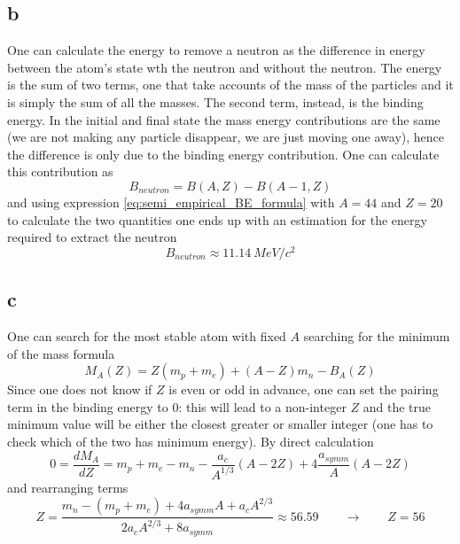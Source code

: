 \subsection*{b}
One can calculate the energy to remove a neutron as the difference in energy between the atom's state wth the neutron and without the neutron. The energy is the sum of
two terms, one that take accounts of the mass of the particles and it is simply the sum of all the masses. The second term, instead, is the binding energy. In the initial and final
state the mass energy contributions are the same (we are not making any particle disappear, we are just moving one away), hence the difference is only due to the binding energy contribution. One can
calculate this contribution as
\begin{equation*}
    B_{neutron} = B(A, Z) - B(A-1, Z)
\end{equation*}
and using expression \ref{eq:semi_empirical_BE_formula} with $A=44$ and $Z=20$ to calculate the two quantities one ends up with an estimation for the energy required to extract the neutron
\begin{equation*}
    B_{neutron} \approx 11.14~MeV/c^2
\end{equation*}

\subsection*{c}
One can search for the most stable atom with fixed $A$ searching for the minimum of the mass formula
\begin{equation*}
    M_A(Z) = Z(m_p + m_e) + (A-Z)m_n - B_A(Z)
\end{equation*}
Since one does not know if $Z$ is even or odd in advance, one can set the pairing term in the binding energy to $0$: this will lead to a non-integer $Z$ and 
the true minimum value will be either the closest greater or smaller integer (one has to check which of the two has minimum energy).
By direct calculation
\begin{equation*}
    0 = \frac{dM_A}{dZ} = m_p + m_e - m_n - \frac{a_c}{A^{1/3}} \left(A-2Z\right) + 4\frac{a_{symm}}{A} \left(A-2Z\right)
\end{equation*}
and rearranging terms
\begin{equation*}
    Z = \frac{m_n - (m_p + m_e) + 4a_{symm}A + a_c A^{2/3}}{2a_c A^{2/3} + 8a_{symm}} \approx 56.59 \qquad \longrightarrow \qquad Z = 56
\end{equation*}

